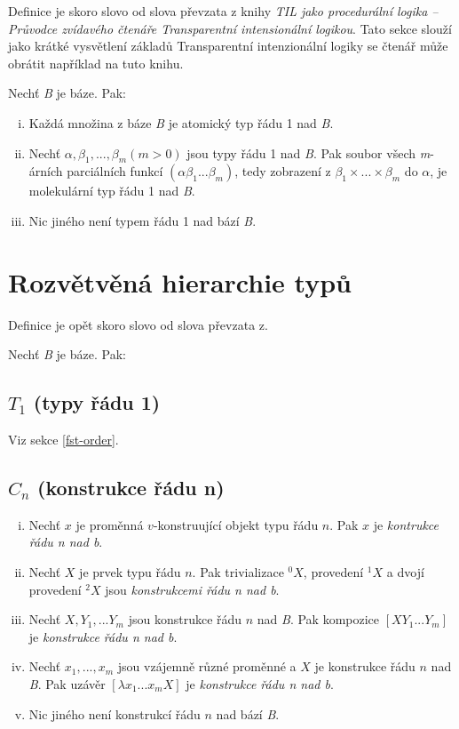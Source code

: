 Definice je skoro slovo od slova převzata z knihy
\textit{TIL jako procedurální logika -- Průvodce zvídavého čtenáře Transparentní intensionální
logikou}. Tato sekce slouží jako krátké vysvětlení základů Transparentní intenzionální logiky
se čtenář může obrátit například na tuto knihu.

Nechť \textit{B} je báze. Pak:

\begin{enumerate}[i)]
    \item Každá množina z báze \textit{B} je atomický typ řádu 1 nad \textit{B}.
    \item Nechť $\alpha, \beta_1, ...,\beta_m (m > 0)$ jsou typy řádu 1 nad \textit{B}. Pak soubor
        všech \textit{m}-árních parciálních funkcí $(\alpha\beta_1...\beta_m)$, tedy zobrazení z 
        $\beta_1 \times ... \times \beta_m$ do $\alpha$, je molekulární typ řádu 1 nad \textit{B}.
    \item Nic jiného není typem řádu 1 nad bází \textit{B}.
\end{enumerate}

\section{Rozvětvěná hierarchie typů} \label{type-order}

Definice je opět skoro slovo od slova převzata z.

Nechť \textit{B} je báze. Pak:

\subsection{$T_1$ (typy řádu 1)}
Viz sekce \ref{fst-order}.

\subsection{$C_n$ (konstrukce řádu n)}

\begin{enumerate}[i)]
    \item Nechť $x$ je proměnná $v$-konstruující objekt typu řádu $n$. Pak $x$ je
        \textit{kontrukce řádu n nad b}.
    \item Nechť $X$ je prvek typu řádu $n$. Pak trivializace ${}^0X$, provedení ${}^1X$ a dvojí
        provedení ${}^2X$ jsou \textit{konstrukcemi řádu n nad b}.
    \item Nechť $X, Y_1, ... Y_m$ jsou konstrukce řádu $n$ nad \textit{B}. Pak kompozice 
        $[X Y_1...Y_m]$ je \textit{konstrukce řádu n nad b}.
    \item Nechť $x_1,...,x_m$ jsou vzájemně různé proměnné a $X$ je konstrukce řádu $n$
        nad \textit{B}. Pak uzávěr $[\lambda x_1 ... x_m X]$ je \textit{konstrukce řádu n nad b}.
    \item Nic jiného není konstrukcí řádu $n$ nad bází \textit{B}.
\end{enumerate}

